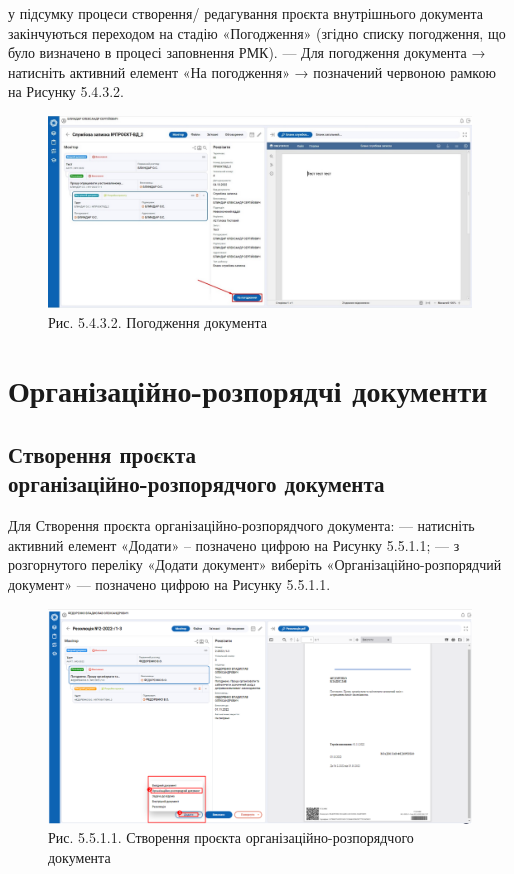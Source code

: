 у підсумку процеси створення/ редагування проєкта внутрішнього
документа закінчуються переходом на стадію «Погодження» (згідно списку
погодження, що було визначено в процесі заповнення РМК).
--- Для погодження документа → натисніть активний елемент «На
погодження» → позначений червоною рамкою на Рисунку 5.4.3.2.

\begin{figure}[!htbp]
\centerline{\includegraphics[width=\textwidth]{img/5.4.3.2.jpg}}
\caption{Рис. 5.4.3.2. Погодження документа}
\end{figure}

\section{Організаційно-розпорядчі документи}

\subsection{Створення проєкта \\ організаційно-розпорядчого документа}

Для Створення проєкта організаційно-розпорядчого документа:
--- натисніть активний елемент «Додати» – позначено цифрою  на Рисунку 5.5.1.1;
--- з розгорнутого переліку «Додати документ» виберіть «Організаційно-розпорядчий
документ» --- позначено цифрою  на Рисунку 5.5.1.1.

\begin{figure}[!htbp]
\centerline{\includegraphics[width=\textwidth]{img/5.5.1.1.png}}
\caption{Рис. 5.5.1.1. Створення проєкта організаційно-розпорядчого документа}
\end{figure}

